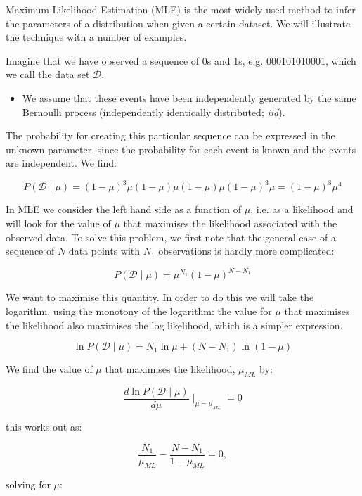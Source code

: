 Maximum Likelihood Estimation (MLE) is the most widely used method to infer the parameters of a distribution when given a certain dataset. We will illustrate the technique
with a number of examples.


Imagine that we have observed a sequence of 0s and 1s, e.g. 000101010001, which we call the data set $\mathcal{D}$.

\begin{itemize}
\item We assume that these events have been independently generated by the same Bernoulli process (independently identically distributed; \emph{iid}).
\end{itemize}

The probability for creating this particular sequence can be expressed in the unknown parameter, since the probability for each event is known and the events are independent.
We find:

$$
P(\mathcal{D} \mid \mu ) = (1-\mu)^3\mu(1-\mu)\mu(1-\mu)\mu(1-\mu)^3\mu = (1 - \mu)^8 \mu^4
$$

In MLE we consider the left hand side as a function of $\mu$, i.e. as a likelihood and will look for the value of $\mu$ that maximises the likelihood associated with the
observed data. To solve this problem, we first note that the general case of a sequence of $N$ data points with $N_1$ observations is hardly more complicated:

\begin{equation}
P(\mathcal{D} \mid \mu ) = \mu^{N_1}(1 - \mu)^{N - N_1}
\end{equation}

We want to maximise this quantity. In order to do this we will take the logarithm, using the monotony
of the logarithm: the value for $\mu$ that maximises the likelihood also maximises the log likelihood, which is a simpler expression.

$$
\ln P(\mathcal{D} \mid \mu) = N_1 \ln \mu + (N - N_1) \ln (1 - \mu)
$$

We find the value of $\mu$ that maximises the likelihood, $\mu_{ML}$ by:

$$
\frac{d \ln P(\mathcal{D} \mid \mu) }{d \mu} \mid_{\mu = \mu_{ML}} = 0
$$

this works out as:

$$
\frac{N_1}{\mu_{ML}} - \frac{N - N_1}{1 - \mu_{ML}} = 0,
$$

solving for  $\mu$:

